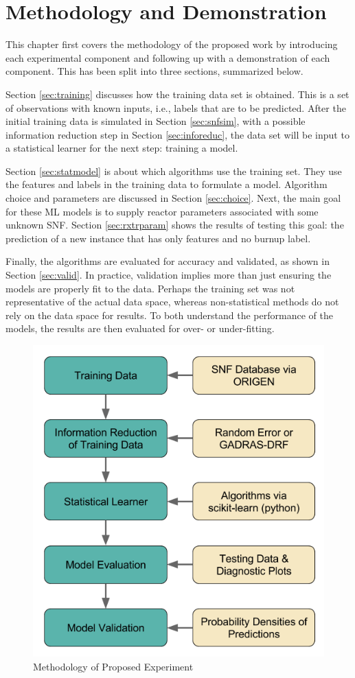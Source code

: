 \chapter{Methodology and Demonstration}
\label{ch:demo_method}

This chapter first covers the methodology of the proposed work by introducing
each experimental component and following up with a demonstration of each
component. This has been split into three sections, summarized below.

Section \ref{sec:training} discusses how the training data set is obtained.
This is a set of observations with known inputs, i.e., labels that are to be
predicted. After the initial training data is simulated in Section
\ref{sec:snfsim}, with a possible information reduction step in Section
\ref{sec:inforeduc}, the data set will be input to a statistical learner for
the next step: training a model.

Section \ref{sec:statmodel} is about which algorithms use the training set.
They use the features and labels in the training data to formulate a model.
Algorithm choice and parameters are discussed in Section \ref{sec:choice}.
Next, the main goal for these \gls{ML} models is to supply reactor
parameters associated with some unknown \gls{SNF}. Section \ref{sec:rxtrparam}
shows the results of testing this goal: the prediction of a new instance that
has only features and no burnup label.  

Finally, the algorithms are evaluated for accuracy and validated, as shown in
Section \ref{sec:valid}. In practice, validation implies more than just
ensuring the models are properly fit to the data.  Perhaps the training set was
not representative of the actual data space, whereas non-statistical methods do
not rely on the data space for results. To both understand the performance of
the models, the results are then evaluated for over- or under-fitting. 

\begin{figure}[!htb]
  \centering
  \includegraphics[width=0.8\linewidth]{./chapters/demo_method/methodology.png}
  \caption{Methodology of Proposed Experiment}
  \label{fig:method}
\end{figure}

